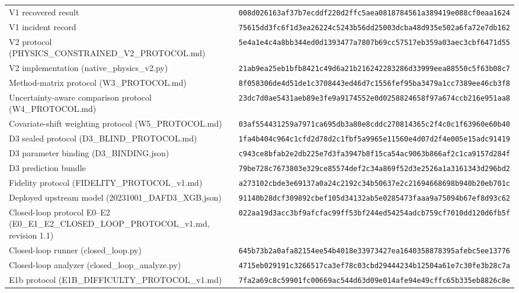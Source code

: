 \documentclass[11pt,a4paper]{article}
\begin{document}
\begin{center}
{\begin{tabular}{ll}
V1 recovered result & \texttt{008d026163af37b7ecddf220d2ffc5aea0818784561a389419e088cf0eaa1624} \\
V1 incident record & \texttt{75615dd3fc6f1d3ea26224c5243b56dd25003dcba48d935e502a6fa72e7db162} \\
V2 protocol (PHYSICS\_CONSTRAINED\_V2\_PROTOCOL.md) & \texttt{5e4a1e4c4a8bb344ed0d1393477a7807b69cc57517eb359a03aec3cbf6471d55} \\
V2 implementation (native\_physics\_v2.py) & \texttt{21ab9ea25eb1bfb8421c49d6a21b216242283286d33999eea88550c5f63b08c7} \\
Method-matrix protocol (W3\_PROTOCOL.md) & \texttt{8f058306de4d51de1c3708443ed46d7c1556fef95ba3479a1cc7389ee46cb3f8} \\
Uncertainty-aware comparison protocol (W4\_PROTOCOL.md) & \texttt{23dc7d0ae5431aeb89e3fe9a9174552e0d0258824658f97a674ccb216e951aa8} \\
Covariate-shift weighting protocol (W5\_PROTOCOL.md) & \texttt{03af554431259a7971ca695db3a80e8cddc270814365c2f4c0c1f63960e60b40} \\
D3 sealed protocol (D3\_BLIND\_PROTOCOL.md) & \texttt{1fa4b404c964c1cfd2d78d2c1fbf5a9965e11560e4d07d2f4e005e15adc91419} \\
D3 parameter binding (D3\_BINDING.json) & \texttt{c943ce8bfab2e2db225e7d3fa3947b8f15ca54ac9063b866af2c1ca9157d284f} \\
D3 prediction bundle & \texttt{79be728c7673803e329ce85574def2c34a869f52d3e2526a1a3161343d296bd2} \\
Fidelity protocol (FIDELITY\_PROTOCOL\_v1.md) & \texttt{a273102cbde3e69137a0a24c2192c34b50637e2c21694668698b940b20eb701c} \\
Deployed upstream model (20231001\_DAFD3\_XGB.json) & \texttt{91140b28dcf309892cbef105d34132ab5e0285473faaa9a75094b67ef8d93c62} \\
Closed-loop protocol E0--E2 (E0\_E1\_E2\_CLOSED\_LOOP\_PROTOCOL\_v1.md, revision 1.1) & \texttt{022aa19d3acc3bf9afcfac99ff53bf244ed54254adcb759cf7010dd120d6fb5f} \\
Closed-loop runner (closed\_loop.py) & \texttt{645b73b2a0afa82154ee54b4018e33973427ea1640358878395afebc5ee13776} \\
Closed-loop analyzer (closed\_loop\_analyze.py) & \texttt{4715eb029191c3266517ca3ef78c03cbd29444234b12504a61e7c30fe3b28c7a} \\
E1b protocol (E1B\_DIFFICULTY\_PROTOCOL\_v1.md) & \texttt{7fa2a69c8c59901fc00669ac544d63d09e014afe94e49cffc65b335eb8826c8e} \\

\end{tabular}}
\end{center}
\end{document}
